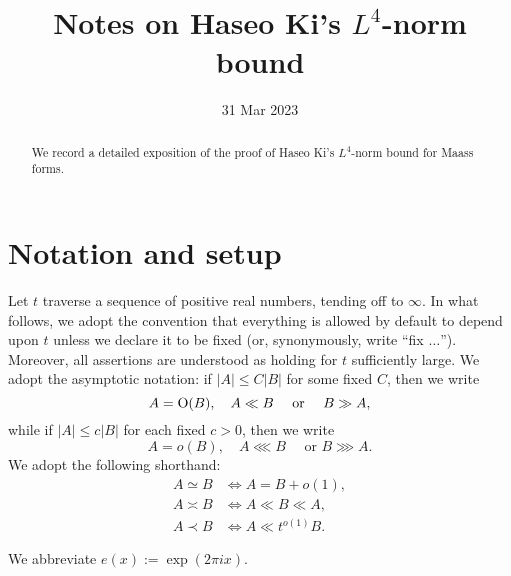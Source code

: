 \documentclass[reqno]{amsart} 
\begin{document}
\title{Notes on Haseo Ki's $L^4$-norm bound}
\date{31 Mar 2023}
\maketitle
\tableofcontents

\begin{abstract}
  We record a detailed exposition of the proof of Haseo Ki's $L^4$-norm bound for Maass forms.
\end{abstract}

\section{Notation and setup}\label{sec:cqx50ayzoa}
Let $t$ traverse a sequence of positive real numbers, tending off to $\infty$.  In what follows, we adopt the convention that everything is allowed by default to depend upon $t$ unless we declare it to be fixed (or, synonymously, write ``fix $\dotsc$'').  Moreover, all assertions are understood as holding for $t$ sufficiently large.  We adopt the asymptotic notation: if $|A| \leq C |B|$ for some fixed $C$, then we write
\begin{equation*}
  A = \operatorname{O}(B), \quad A \ll B \quad \text{ or } \quad  B \gg A,
\end{equation*}
while if $|A| \leq c |B|$ for each fixed $c > 0$, then we write
\begin{equation*}
  A = o(B), \quad  A \lll B \quad \text{ or }  B \ggg A.
\end{equation*}
We adopt the following shorthand:
\begin{align*}
  A \simeq B
  &\iff
    A = B + o(1),  \\
  A \asymp B &\iff A \ll B \ll A, \\
  A \prec B &\iff A \ll t^{o(1)} B.
\end{align*}

We abbreviate $e(x) := \exp(2 \pi i x)$.
\end{document}
